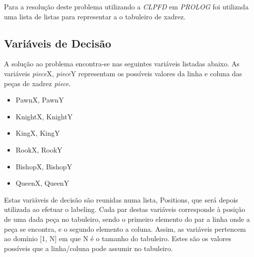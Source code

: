 \documentclass[runningheads]{llncs}
\begin{document}
Para a resolução deste problema utilizando a \emph{CLPFD} em \emph{PROLOG} foi utilizada uma lista de listas para representar a
o tabuleiro de xadrez.

\subsection{Variáveis de Decisão}
    A solução ao problema encontra-se nas seguintes variáveis listadas abaixo. As variáveis \emph{piece}X, \emph{piece}Y 
    representam os possíveis valores da linha e coluna das peças de xadrez \emph{piece}.
    
    \begin{itemize}
        \item PawnX, PawnY
        \item KnightX, KnightY
        \item KingX, KingY
        \item RookX, RookY
        \item BishopX, BishopY
        \item QueenX, QueenY
    \end{itemize}
    
    Estas variáveis de decisão são reunidas numa lista, Positions, que será depois utilizada ao efetuar o labeling.
    Cada par destas variáveis corresponde à posição de uma dada peça no tabuleiro, sendo o primeiro elemento do par a linha onde a peça se encontra, e o segundo elemento a coluna.
    Assim, as variáveis pertencem ao domínio [1, N] em que N é o tamanho do tabuleiro. Estes são os valores possíveis que a linha/coluna pode assumir no tabuleiro.
    
\end{document}
